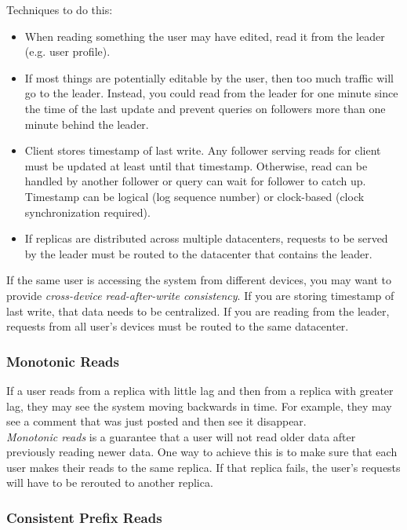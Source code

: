 \documentclass[12pt, titlepage]{article}
\begin{document}
Techniques to do this:
\begin{itemize}
	\item When reading something the user may have edited, read it from the leader (e.g. user profile).
	\item If most things are potentially editable by the user, then too much traffic will go to the leader. Instead, you could read from the leader for one minute since the time of the last update and prevent queries on followers more than one minute behind the leader.
	\item Client stores timestamp of last write. Any follower serving reads for client must be updated at least until that timestamp. Otherwise, read can be handled by another follower or query can wait for follower to catch up. Timestamp can be logical (log sequence number) or clock-based (clock synchronization required).
	\item If replicas are distributed across multiple datacenters, requests to be served by the leader must be routed to the datacenter that contains the leader.
\end{itemize}

If the same user is accessing the system from different devices, you may want to provide \textit{cross-device read-after-write consistency}. If you are storing timestamp of last write, that data needs to be centralized. If you are reading from the leader, requests from all user's devices must be routed to the same datacenter.

\subsubsection{Monotonic Reads}

If a user reads from a replica with little lag and then from a replica with greater lag, they may see the system moving backwards in time. For example, they may see a comment that was just posted and then see it disappear. \\

\textit{Monotonic reads} is a guarantee that a user will not read older data after previously reading newer data. One way to achieve this is to make sure that each user makes their reads to the same replica. If that replica fails, the user's requests will have to be rerouted to another replica.

\subsubsection{Consistent Prefix Reads}
\end{document}
